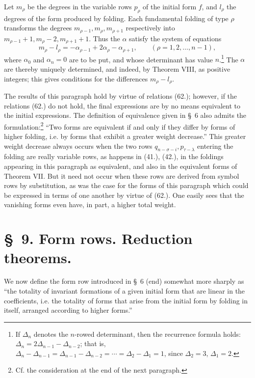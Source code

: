 \documentclass[11pt]{article}
\begin{document}
Let $m_\rho$ be the degrees in the variable rows $p_\rho$ of the initial form $f$, and $l_\rho$ the degrees of the form produced by folding. Each fundamental folding of type $\rho$ transforms the degrees $m_{\rho-1},m_\rho,m_{\rho+1}$ respectively into $m_{\rho-1}+1,m_\rho-2,m_{\rho+1}+1$. Thus the $\alpha$ satisfy the system of equations
\begin{equation}
 m_\rho-l_\rho=-\alpha_{\rho-1}+2\alpha_\rho-\alpha_{\rho+1},
 \qquad (\rho=1,2,\ldots,n-1),
\tag{70}
\end{equation}
where $\alpha_0$ and $\alpha_n=0$ are to be put, and whose determinant has value $n$.\footnote{If $\Delta_n$ denotes the $n$-rowed determinant, then the recurrence formula holds: $\Delta_n=2\Delta_{n-1}-\Delta_{n-2}$; that is, $\Delta_n-\Delta_{n-1}=\Delta_{n-1}-\Delta_{n-2}=\cdots=\Delta_2-\Delta_1=1$, since $\Delta_2=3$, $\Delta_1=2$.} The $\alpha$ are thereby uniquely determined, and indeed, by Theorem VIII, as positive integers; this gives conditions for the differences $m_\rho-l_\rho$.

The results of this paragraph hold by virtue of relations (62.); however, if the relations (62.) do not hold, the final expressions are by no means equivalent to the initial expressions. The definition of equivalence given in \S\ 6 also admits the formulation:\footnote{Cf. the consideration at the end of the next paragraph.} ``Two forms are equivalent if and only if they differ by forms of higher folding, i.e. by forms that exhibit a greater weight decrease.'' This greater weight decrease always occurs when the two rows $q_{n-\sigma-i},p_{\tau-\lambda}$ entering the folding are really variable rows, as happens in (41.), (42.), in the foldings appearing in this paragraph as equivalent, and also in the equivalent forms of Theorem VII. But it need not occur when these rows are derived from symbol rows by substitution, as was the case for the forms of this paragraph which could be expressed in terms of one another by virtue of (62.). One easily sees that the vanishing forms even have, in part, a higher total weight.

\section*{\S\ 9. Form rows. Reduction theorems.}
We now define the form row introduced in \S\ 6 (end) somewhat more sharply as ``the totality of invariant formations of a given initial form that are linear in the coefficients, i.e. the totality of forms that arise from the initial form by folding in itself, arranged according to higher forms.''
\end{document}
